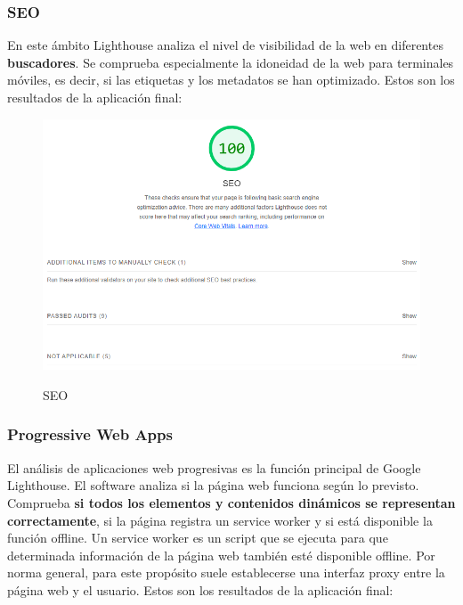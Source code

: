 \documentclass[12pt,twoside,titlepage]{report}
\begin{document}
\subsubsection{SEO}

En este ámbito Lighthouse analiza el nivel de visibilidad de la web en diferentes \textbf{buscadores}. Se comprueba especialmente la idoneidad de la web para terminales móviles, es decir, si las etiquetas y los metadatos se han optimizado. Estos son los resultados de la aplicación final:

\begin{figure}[H]
    \centering
    \includegraphics[scale=0.6]{Lighthouse_seo}
    \label{fig:Lighthouse_seo}
    \caption{SEO}
\end{figure}

\subsubsection{Progressive Web Apps}

El análisis de aplicaciones web progresivas es la función principal de Google Lighthouse. El software analiza si la página web funciona según lo previsto. Comprueba \textbf{si todos los elementos y contenidos dinámicos se representan correctamente}, si la página registra un service worker y si está disponible la función offline. Un service worker es un script que se ejecuta para que determinada información de la página web también esté disponible offline. Por norma general, para este propósito suele establecerse una interfaz proxy entre la página web y el usuario. Estos son los resultados de la aplicación final:
\end{document}

